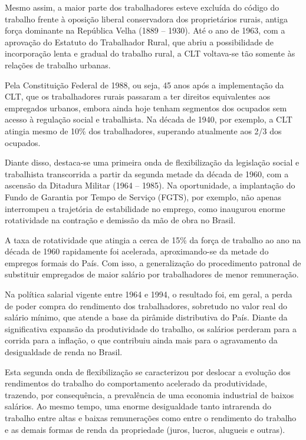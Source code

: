 Mesmo assim, a maior parte dos trabalhadores esteve excluída do código
do trabalho frente à oposição liberal conservadora dos proprietários
rurais, antiga força dominante na República Velha (1889 -- 1930). Até o
ano de 1963, com a aprovação do Estatuto do Trabalhador Rural, que abriu
a possibilidade de incorporação lenta e gradual do trabalho rural, a CLT
voltava-se tão somente às relações de trabalho urbanas.

Pela Constituição Federal de 1988, ou seja, 45 anos após a implementação
da CLT, que os trabalhadores rurais passaram a ter direitos equivalentes
aos empregados urbanos, embora ainda hoje tenham segmentos dos ocupados
sem acesso à regulação social e trabalhista. Na década de 1940, por
exemplo, a CLT atingia mesmo de 10\% dos trabalhadores, superando
atualmente aos 2/3 dos ocupados.

Diante disso, destaca-se uma primeira onda de flexibilização da
legislação social e trabalhista transcorrida a partir da segunda metade
da década de 1960, com a ascensão da Ditadura Militar (1964 -- 1985). Na
oportunidade, a implantação do Fundo de Garantia por Tempo de Serviço
(FGTS), por exemplo, não apenas interrompeu a trajetória de estabilidade
no emprego, como inaugurou enorme rotatividade na contração e demissão
da mão de obra no Brasil.

A taxa de rotatividade que atingia a cerca de 15\% da força de trabalho
ao ano na década de 1960 rapidamente foi acelerada, aproximando-se da
metade do empregos formais do País. Com isso, a generalização do
procedimento patronal de substituir empregados de maior salário por
trabalhadores de menor remuneração.

Na política salarial vigente entre 1964 e 1994, o resultado foi, em
geral, a perda de poder compra do rendimento dos trabalhadores,
sobretudo no valor real do salário mínimo, que atende a base da pirâmide
distributiva do País. Diante da significativa expansão da produtividade
do trabalho, os salários perderam para a corrida para a inflação, o que
contribuiu ainda mais para o agravamento da desigualdade de renda no
Brasil.

Esta segunda onda de flexibilização se caracterizou por deslocar a
evolução dos rendimentos do trabalho do comportamento acelerado da
produtividade, trazendo, por consequência, a prevalência de uma economia
industrial de baixos salários. Ao mesmo tempo, uma enorme desigualdade
tanto intrarenda do trabalho entre altas e baixas remunerações como
entre o rendimento do trabalho e as demais formas de renda da
propriedade (juros, lucros, alugueis e outras).

